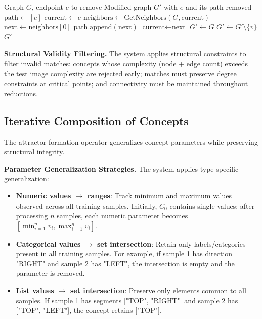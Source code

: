 \documentclass[12pt, a4paper]{article}
\begin{document}
\begin{algorithm}
\caption{Endpoint Reduction via Path Removal}
\label{alg:endpoint}
\begin{algorithmic}[1]
\Require Graph $G$, endpoint $e$ to remove
\Ensure Modified graph $G'$ with $e$ and its path removed
\State $\text{path} \gets [e]$
\State $\text{current} \gets e$
    \State $\text{neighbors} \gets \text{GetNeighbors}(G, \text{current})$
    \State $\text{next} \gets \text{neighbors}[0]$ 
    \State $\text{path.append}(\text{next})$
    \State $\text{current} \gets \text{next}$
\EndWhile
\State $G' \gets G$
 
    \State $G' \gets G' \setminus \{v\}$ 
\EndFor
\State \Return $G'$
\end{algorithmic}
\end{algorithm}

\textbf{Structural Validity Filtering.} The system applies structural constraints to filter invalid matches: concepts whose complexity (node + edge count) exceeds the test image complexity are rejected early; matches must preserve degree constraints at critical points; and connectivity must be maintained throughout reductions.

\subsection{Iterative Composition of Concepts}

The attractor formation operator generalizes concept parameters while preserving structural integrity.

\textbf{Parameter Generalization Strategies.} The system applies type-specific generalization:
\begin{itemize}
\item \textbf{Numeric values $\rightarrow$ ranges}: Track minimum and maximum values observed across all training samples. Initially, $C_0$ contains single values; after processing $n$ samples, each numeric parameter becomes $[\min_{i=1}^n v_i, \max_{i=1}^n v_i]$.
\item \textbf{Categorical values $\rightarrow$ set intersection}: Retain only labels/categories present in all training samples. For example, if sample 1 has direction "RIGHT" and sample 2 has "LEFT", the intersection is empty and the parameter is removed.
\item \textbf{List values $\rightarrow$ set intersection}: Preserve only elements common to all samples. If sample 1 has segments ["TOP", "RIGHT"] and sample 2 has ["TOP", "LEFT"], the concept retains ["TOP"].
\end{itemize}
\end{document}
